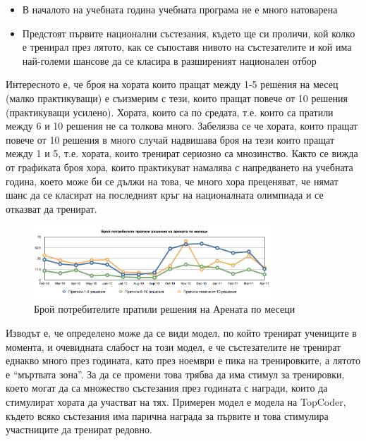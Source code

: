 \documentclass[a4paper,12pt]{article}
\begin{document}
  \begin{itemize}
    \item В началото на учебната година учебната програма не е много натоварена
    \item Предстоят първите национални състезания, където ще си проличи, кой колко е тренирал през лятото, как се съпоставя нивото на състезателите и кой има най-големи шансове да се класира в разширеният национален отбор
  \end{itemize}
  
  Интересното е, че броя на хората които пращат между 1-5 решения на месец (малко практикуващи) е съизмерим с тези, които пращат повече от 10 решения (практикуващи усилено). Хората, които са по средата, т.е. които са пратили между 6 и 10 решения не са толкова много. Забелязва се че хората, които пращат повече от 10 решения в много случай надвишава броя на тези които пращат между 1 и 5, т.е. хората, които тренират сериозно са мнозинство. Както се вижда от графиката броя хора, които практикуват намалява с напредването на учебната година, което може би се дължи на това, че много хора преценяват, че нямат шанс да се класират на последният кръг на националната олимпиада и се отказват да тренират.
  
  \begin{figure}[ht]
    \begin{center}
      \includegraphics[width=0.8\textwidth]{images/submitting_users.png}
    \end{center}
    \caption{Брой потребителите пратили решения на Арената по месеци}
    \label{submitting_users}
  \end{figure}
  
  Изводът е, че определено може да се види модел, по който тренират учениците в момента, и очевидната слабост на този модел, е че състезателите не тренират еднакво много през годината, като през ноември е пика на тренировките, а лятото е ``мъртвата зона''. За да се промени това трябва да има стимул за тренировки, което могат да са множество състезания през годината с награди, които да стимулират хората да участват на тях. Примерен модел е модела на TopCoder, където всяко състезания има парична награда за първите и това стимулира участниците да тренират редовно.
  
\end{document}
